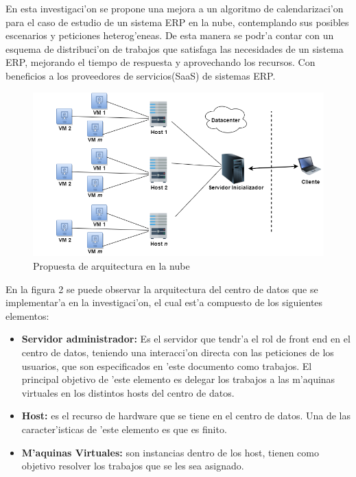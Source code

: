 En esta investigaci'on se propone una mejora a un algoritmo de calendarizaci'on para el caso de estudio de un sistema ERP en la nube, contemplando sus posibles escenarios y peticiones heterog'eneas. De esta manera se podr'a contar con un esquema de distribuci'on de trabajos que satisfaga las necesidades de un sistema ERP, mejorando el tiempo de respuesta y aprovechando los recursos. Con beneficios a los proveedores de servicios(SaaS) de sistemas ERP.

\begin{figure}
	
	\centering
	\includegraphics[scale=0.5]{media/cloud2}
	\caption{Propuesta de arquitectura en la nube}
\end{figure}


En la figura 2 se puede observar la arquitectura del centro de datos que se implementar'a en la investigaci'on, el cual est'a compuesto de los siguientes elementos:

\begin{itemize}
\item \textbf{Servidor administrador:} Es el servidor que tendr'a el rol de front end en el centro de datos, teniendo una interacci'on directa con las peticiones de los usuarios, que son especificados en 'este documento como trabajos.
El principal objetivo de 'este elemento es delegar los trabajos a las m'aquinas virtuales en los distintos hosts del centro de datos.
\item \textbf{Host:} es el recurso de hardware que se tiene en el centro de datos. Una de las caracter'isticas de 'este elemento es que es finito.
\item \textbf{M'aquinas Virtuales:} son instancias dentro de los host, tienen como objetivo resolver los trabajos que se les sea asignado.


\end{itemize}